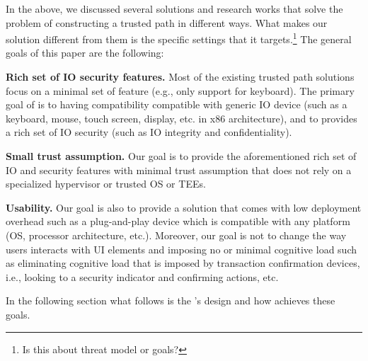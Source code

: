 In the above, we discussed several solutions and research works that solve the problem of constructing a trusted path in different ways. What makes our solution different from them is the specific settings that it targets.\footnote{Is this about threat model or goals?}
The general goals of this paper are the following:

\begin{mylist}
  \item  \textbf{Rich set of IO security features.} Most of the existing trusted path solutions focus on a minimal set of feature (e.g., only support for keyboard). The primary goal of \name is to having compatibility compatible with generic IO device (such as a keyboard, mouse, touch screen, display, etc. in x86 architecture), and to provides a rich set of IO security (such as IO integrity and confidentiality). 
  
  \item  \textbf{Small trust assumption.} Our goal is to provide the aforementioned rich set of IO and security features with minimal trust assumption that does not rely on a specialized hypervisor or trusted OS or TEEs. %
  
  \item \textbf{Usability.} Our goal is also to provide a solution that comes with low deployment overhead such as a plug-and-play device which is compatible with any platform (OS, processor architecture, etc.). Moreover, our goal is not to change the way users interacts with UI elements and imposing no or minimal cognitive load such as eliminating cognitive load that is imposed by transaction confirmation devices, i.e., looking to a security indicator and confirming actions, etc. 

\end{mylist}

In the following section what follows is the \name's design and how \name achieves these goals.

